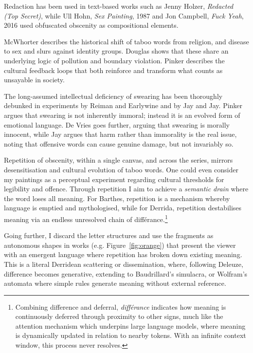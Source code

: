 \documentclass[12pt]{article}
\begin{document}
Redaction has been used in text-based works such as Jenny Holzer,
\emph{Redacted (Top Secret)}, while Ull Hohn, \emph{Sex Painting},
1987 and Jon Campbell, \emph{Fuck Yeah}, 2016 used obfuscated obscenity
as compositional elements.

McWhorter describes the historical shift of taboo words from religion,
and disease to sex and slurs against identity
groups.\cite{mcwhorter2024nine} Douglas shows that these share an
underlying logic of pollution and boundary violation.\cite{douglas1966purity}
Pinker describes the cultural feedback loops that both reinforce and
transform what counts as unsayable in society.\cite{pinker2008seven}

The long-assumed intellectual deficiency of swearing has been
thoroughly debunked in experiments by Reiman and
Earlywine\cite{reiman2022swearfluency} and by Jay and
Jay.\cite{jay2015taboo} Pinker argues that
swearing is not inherently immoral; instead it is an evolved form of
emotional language.\cite{pinker2017moral} De Vries goes further, arguing that swearing is
morally innocent,\cite{devries2023swearing} while Jay argues that harm
rather than immorality is the real issue, noting that offensive words
can cause genuine damage, but not invariably so.\cite{jay2009offensive}

Repetition of obscenity, within a single canvas, and across the series,
mirrors desensitisation and cultural evolution of taboo words. One
could even consider my paintings as a perceptual experiment regarding
cultural thresholds for legibility and offence. Through repetition I
aim to achieve a \emph{semantic drain} where the word loses all
meaning. For Barthes, repetition is a mechanism whereby language is
emptied and mythologised,\cite{barthes1957mythologies} while for
Derrida,\cite{derrida1972dissemination} repetition destabilises
meaning via an endless unresolved chain of
diff\'erance.\footnote{Combining difference and deferral,
  \emph{diff\'erance} indicates how meaning is continuously deferred
  through proximity to other signs, much like the attention mechanism
  which underpins large language models, where meaning is dynamically
  updated in relation to nearby tokens. With an infinite context
  window, this process never resolves.}

Going further, I discard the letter structures and use the fragments
as autonomous shapes in works (e.g. Figure~\ref{fig:orange}) that
present the viewer with an emergent language where repetition has
broken down existing meaning. This is a literal Derridean scattering
or dissemination,\cite{derrida1972dissemination} where, following
Deleuze,\cite{deleuze1968difference} difference becomes generative,
extending to Baudrillard's simulacra,\cite{baudrillard1981simulacra}
or Wolfram's automata\cite{wolfram} where simple rules generate
meaning without external reference.
\end{document}
